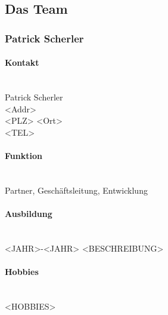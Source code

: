 \clearpage

\subsection{Das Team}

\subsubsection{Patrick Scherler}
\noindent\begin{minipage}{0.7\textwidth}
	\paragraph{Kontakt} \hfill \\
	Patrick Scherler \\
	<Addr> \\
	<PLZ> <Ort> \\
	<TEL> \\
	
	\paragraph{Funktion} \hfill \\
	Partner, Geschäftsleitung, Entwicklung \\
	
	\paragraph{Ausbildung} \hfill \\
	<JAHR>-<JAHR> \hspace{2cm} <BESCHREIBUNG> \\
		
	\paragraph{Hobbies} \hfill \\
	<HOBBIES> \\
\end{minipage}
\hfill
